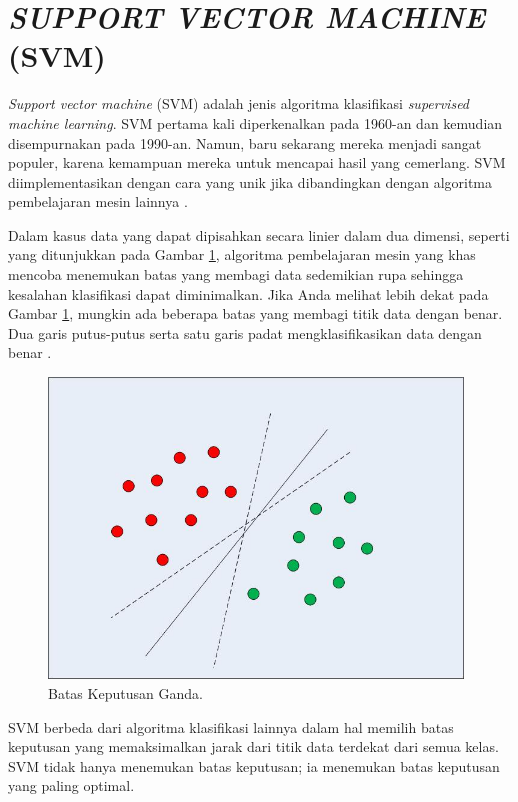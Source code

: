 \section{\uppercase{\textit{SUPPORT VECTOR MACHINE} (SVM)}}
\textit{Support vector machine} (SVM) adalah jenis algoritma klasifikasi \textit{supervised machine learning}. SVM pertama kali diperkenalkan pada 1960-an dan kemudian disempurnakan pada 1990-an. Namun, baru sekarang mereka menjadi sangat populer, karena kemampuan mereka untuk mencapai hasil yang cemerlang. SVM diimplementasikan dengan cara yang unik jika dibandingkan dengan algoritma pembelajaran mesin lainnya \citep{Campbell2010}.

\par Dalam kasus data yang dapat dipisahkan secara linier dalam dua dimensi, seperti yang ditunjukkan pada Gambar \ref{svm1}, algoritma pembelajaran mesin yang khas mencoba menemukan batas yang membagi data sedemikian rupa sehingga kesalahan klasifikasi dapat diminimalkan. Jika Anda melihat lebih dekat pada Gambar \ref{svm1}, mungkin ada beberapa batas yang membagi titik data dengan benar. Dua garis putus-putus serta satu garis padat mengklasifikasikan data dengan benar \citep{Zhibin2008}.

\begin{figure}[H]
	\centering
	\includegraphics[width=11cm, height=8cm]{gambar/implementing-svm-kernel-svm-python-scikit-learn}
	\caption{Batas Keputusan Ganda.}
	\label{svm1}
\end{figure}

\par SVM berbeda dari algoritma klasifikasi lainnya dalam hal memilih batas keputusan yang memaksimalkan jarak dari titik data terdekat dari semua kelas. SVM tidak hanya menemukan batas keputusan; ia menemukan batas keputusan yang paling optimal.

